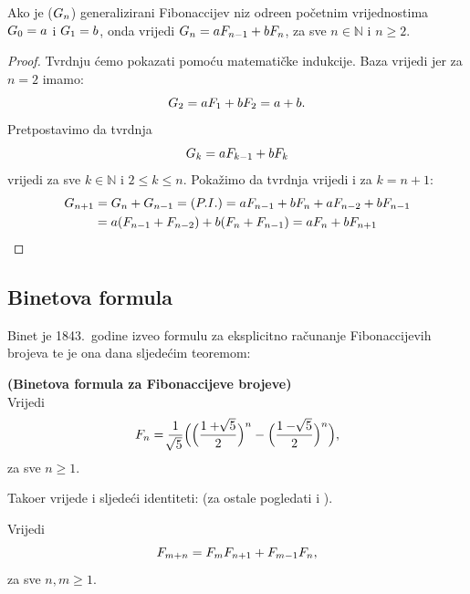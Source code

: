 \documentclass[14pt]{scrartcl}
\begin{document}
\begin{propozicija}
Ako je ($G\sb{n}$) generalizirani Fibonaccijev niz odre\dj{}en po\v{c}etnim vrijednostima $G\sb{0} = a$ i $G\sb{1} = b$, onda vrijedi $G\sb{n} = aF\sb{n-1}+bF\sb{n}$, za sve $n\in\mathbb{N}$ i $n \geq 2$.
\end{propozicija}
\newpage
\begin{proof}
Tvrdnju \'{c}emo pokazati pomo\'{c}u matemati\v{c}ke indukcije. Baza vrijedi jer za $n=2$ imamo:
\begin{equation}
G\sb{2} = aF\sb{1}+bF\sb{2} = a+b. \notag
\end{equation}
Pretpostavimo da tvrdnja
\begin{equation}
G\sb{k} = aF\sb{k-1}+bF\sb{k} \notag
\end{equation}
vrijedi za sve $k\in\mathbb{N}$ i $2 \leq k \leq n$. Poka\v{z}imo da tvrdnja vrijedi i za $k = n + 1$:
\begin{multline}
G\sb{n+1}=G\sb{n}+G\sb{n-1}=(P.I.)=aF\sb{n-1}+bF\sb{n}+aF\sb{n-2}+bF\sb{n-1}\\
=a(F\sb{n-1}+F\sb{n-2})+b(F\sb{n}+F\sb{n-1})=aF\sb{n}+bF\sb{n+1} \notag
\end{multline}
\end{proof}

\subsection{Binetova formula}\label{binet}
\vspace{5mm}

Binet je 1843.~godine izveo formulu za eksplicitno ra\v{c}unanje Fibonaccijevih brojeva te je ona dana sljede\'{c}im teoremom:

\begin{teorem}\label{tm:binet}
\textbf{(Binetova formula za Fibonaccijeve brojeve)}\\
Vrijedi
\begin{equation}\label{eq:binet}
F\sb{n}=\frac{1}{\sqrt[]{5}}\Bigl(\Bigl(\frac{1+\sqrt[]{5}}{2}\Bigr)\sp{n}-\Bigl(\frac{1-\sqrt[]{5}}{2}\Bigr)\sp{n}\Bigr), 
\end{equation}
za sve $n \geq 1$.\\
\end{teorem}

Tako\dj{}er vrijede i sljede\'{c}i identiteti: (za ostale pogledati \cite{dujella} i \cite{wiki}).

\begin{propozicija}
Vrijedi
\begin{equation}
F\sb{m+n}=F\sb{m}F\sb{n+1}+F\sb{m-1}F\sb{n},
\end{equation}
za sve $n, m \geq 1$.\\
\end{propozicija}
\end{document}
